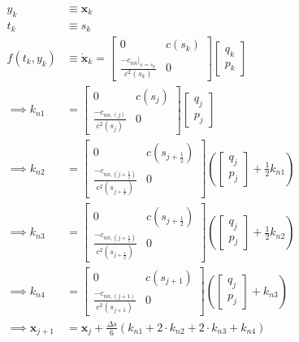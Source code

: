 \documentclass{article}
\begin{document}
\begin{align*}
  y_{k}&\equiv\bm{x}_k\\ 
  t_k&\equiv s_k \\
  f(t_k, y_k)&\equiv\dot{\bm{x}}_k=\begin{bmatrix} 0 & c(s_k) \\ \frac{-c_{nn}|_{s=s_k}}{c^2(s_k)} & 0\end{bmatrix}\begin{bmatrix} q_k \\ p_k\end{bmatrix} \\ {}
  \implies k_{n1} &= \begin{bmatrix} 0 & c(s_j) \\ \frac{-c_{nn, (j)}}{c^2(s_j)} & 0\end{bmatrix}\begin{bmatrix} q_j \\ p_j\end{bmatrix} \\
  \implies k_{n2} &= \begin{bmatrix} 0 & c(s_{j+\frac{1}{2}}) \\ \frac{-c_{nn, (j+\frac{1}{2})}}{c^2(s_{j + \frac{1}{2}})} & 0\end{bmatrix}\left(\begin{bmatrix} q_j \\ p_j\end{bmatrix} + \frac{1}{2}k_{n1} \right) \\
  \implies k_{n3} &= \begin{bmatrix} 0 & c(s_{j+\frac{1}{2}}) \\ \frac{-c_{nn, (j+\frac{1}{2})}}{c^2(s_{j + \frac{1}{2}})} & 0\end{bmatrix}\left(\begin{bmatrix} q_j \\ p_j\end{bmatrix} + \frac{1}{2}k_{n2} \right) \\
  \implies k_{n4} &= \begin{bmatrix} 0 & c(s_{j+1}) \\ \frac{-c_{nn, (j+1)}}{c^2(s_{j + 1})} & 0\end{bmatrix}\left(\begin{bmatrix} q_j \\ p_j\end{bmatrix} + k_{n3} \right) \\
  \implies \bm{x}_{j+1} &= \bm{x}_{j} + \frac{\Delta s}{6}\left(k_{n1} + 2\cdot k_{n2} + 2\cdot k_{n3} + k_{n4} \right)
\end{align*}
\end{document}
